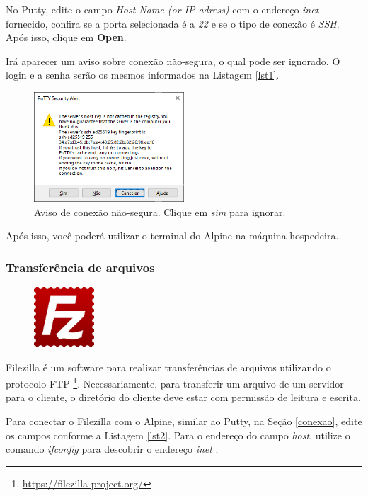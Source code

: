  No Putty, edite o campo \textit{Host Name (or IP adress)} com o endereço \textit{inet} fornecido, confira se a porta selecionada é a \textit{22} e se o tipo de conexão é \textit{SSH}. Após isso, clique em \textbf{Open}.

 Irá aparecer um aviso sobre conexão não-segura, o qual pode ser ignorado. O login e a senha serão os mesmos informados na Listagem \ref{lst1}.

 \begin{figure}[H]
    \centering
    \includegraphics[width=0.5\textwidth]{images/putty4.png}
    \caption{Aviso de conexão não-segura. Clique em \textit{sim} para ignorar.}
    \label{fig1}
\end{figure}

Após isso, você poderá utilizar o terminal do Alpine na máquina hospedeira.

\subsubsection{Transferência de arquivos}\label{transfer}

\begin{figure} %
    \centering
    \includegraphics[width=0.2\textwidth]{../images/filezilla.jpg}
\end{figure}

Filezilla é um software para realizar transferências de arquivos utilizando o protocolo FTP \footnote{\url{https://filezilla-project.org/}}. Necessariamente, para transferir um arquivo de um servidor para o cliente, o diretório do cliente deve estar com permissão de leitura e escrita.

Para conectar o Filezilla com o Alpine, similar ao Putty, na Seção \ref{conexao}, edite os campos conforme a Listagem \ref{lst2}. Para o endereço do campo \textit{host}, utilize o comando \textit{ifconfig} para descobrir o endereço \textit{inet} .

